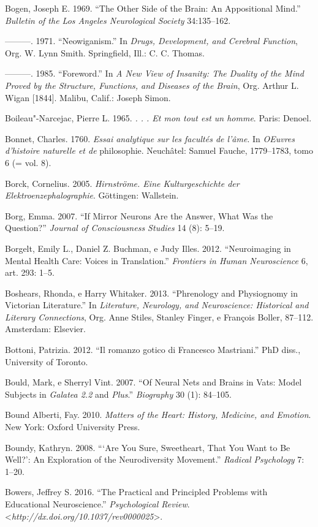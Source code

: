 Bogen, Joseph E. 1969. ``The Other Side of the Brain: An Appositional
Mind.'' \emph{Bulletin of the Los Angeles Neurological Society}
34:135--162.

---------. 1971. ``Neowiganism.'' In \emph{Drugs, Development, and
Cerebral Function}, Org. W. Lynn Smith. Springfield, Ill.: C. C. Thomas.

---------. 1985. ``Foreword.'' In \emph{A New View of Insanity: The
Duality of the Mind Proved by the Structure, Functions, and Diseases of
the Brain}, Org. Arthur L. Wigan {[}1844{]}. Malibu, Calif.: Joseph
Simon.

Boileau"-Narcejac, Pierre L. 1965. \emph{. . . Et mon tout est un homme}.
Paris: Denoel.

Bonnet, Charles. 1760. \emph{Essai analytique sur les facultés de
l'âme}. In \emph{OEuvres d'histoire naturelle et de} philosophie.
Neuchâtel: Samuel Fauche, 1779--1783, tomo 6 (= vol. 8).

Borck, Cornelius. 2005. \emph{Hirnströme. Eine Kulturgeschichte der
Elektroenzephalographie}. Göttingen: Wallstein.

Borg, Emma. 2007. ``If Mirror Neurons Are the Answer, What Was the
Question?'' \emph{Journal of Consciousness Studies} 14 (8): 5--19.

Borgelt, Emily L., Daniel Z. Buchman, e Judy Illes. 2012. ``Neuroimaging
in Mental Health Care: Voices in Translation.'' \emph{Frontiers in Human
Neuroscience} 6, art. 293: 1--5.

Boshears, Rhonda, e Harry Whitaker. 2013. ``Phrenology and Physiognomy
in Victorian Literature.'' In \emph{Literature, Neurology, and
Neuroscience: Historical and Literary Connections}, Org. Anne Stiles,
Stanley Finger, e François Boller, 87--112. Amsterdam: Elsevier.

Bottoni, Patrizia. 2012. ``Il romanzo gotico di Francesco Mastriani.''
PhD diss., University of Toronto.

Bould, Mark, e Sherryl Vint. 2007. ``Of Neural Nets and Brains in Vats:
Model Subjects in \emph{Galatea 2.2} and \emph{Plus}.'' \emph{Biography}
30 (1): 84--105.

Bound Alberti, Fay. 2010. \emph{Matters of the Heart: History, Medicine,
and Emotion}. New York: Oxford University Press.

Boundy, Kathryn. 2008. ```Are You Sure, Sweetheart, That You Want to Be
Well?': An Exploration of the Neurodiversity Movement.'' \emph{Radical
Psychology} 7: 1--20.

Bowers, Jeffrey S. 2016. ``The Practical and Principled Problems with
Educational Neuroscience.'' \emph{Psychological Review}.
\textless{}\emph{http://dx.doi.org/10.1037/rev0000025}\textgreater{}.

